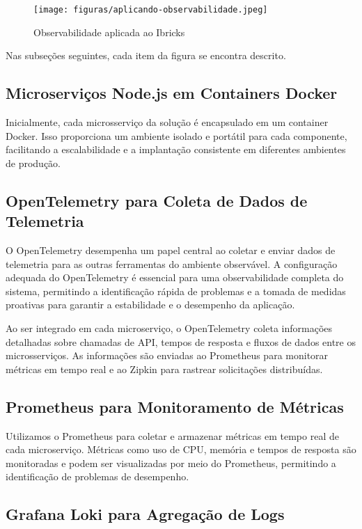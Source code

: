 \documentclass[12pt]{article}
\begin{document}
\begin{figure}[!htb]
\centering
\texttt{[image: figuras/aplicando-observabilidade.jpeg]}
\caption{Observabilidade aplicada ao Ibricks}
\label{fig:observabilidadeIbricks}
\end{figure}

Nas subseções seguintes, cada item da figura se encontra descrito.

\subsection{Microserviços Node.js em Containers Docker}

Inicialmente, cada microsserviço da solução é encapsulado em um container Docker. Isso proporciona um ambiente isolado e portátil para cada componente, facilitando a escalabilidade e a implantação consistente em diferentes ambientes de produção.

\subsection{OpenTelemetry para Coleta de Dados de Telemetria}

O OpenTelemetry desempenha um papel central ao coletar e enviar dados de telemetria para as outras ferramentas do ambiente observável. A configuração adequada do OpenTelemetry é essencial para uma observabilidade completa do sistema, permitindo a identificação rápida de problemas e a tomada de medidas proativas para garantir a estabilidade e o desempenho da aplicação.

Ao ser integrado em cada microserviço, o OpenTelemetry coleta informações detalhadas sobre chamadas de API, tempos de resposta e fluxos de dados entre os microsserviços. As informações são enviadas ao Prometheus para monitorar métricas em tempo real e ao Zipkin para rastrear solicitações distribuídas. 

\subsection{Prometheus para Monitoramento de Métricas}

Utilizamos o Prometheus para coletar e armazenar métricas em tempo real de cada microserviço. Métricas como uso de CPU, memória e tempos de resposta são monitoradas e podem ser visualizadas por meio do Prometheus, permitindo a identificação de problemas de desempenho.

\subsection{Grafana Loki para Agregação de Logs}
\end{document}
